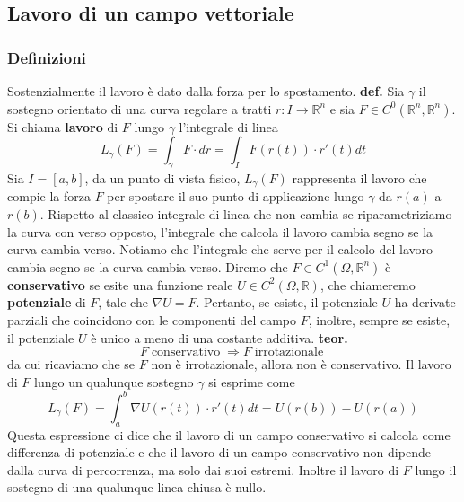 \subsection{Lavoro di un campo vettoriale}
\subsubsection{Definizioni}
Sostenzialmente il lavoro è dato dalla forza per lo spostamento.\newline
\newline
\textbf{def.} Sia $\gamma$ il sostegno orientato di una curva regolare a tratti $r: I \rightarrow \mathbb{R}^n$ e sia $F \in C ^0(\mathbb{R}^n, \mathbb{R}^n)$. Si chiama \textbf{lavoro} di $F$ lungo $\gamma$ l'integrale di linea
\[
    L_\gamma (F) = \int_{\gamma} F \cdot dr = \int_{I} F(r(t))\cdot r'(t) dt
\]
Sia $I = [a,b]$, da un punto di vista fisico, $L_\gamma(F)$ rappresenta il lavoro che compie la forza $F$ per spostare il suo punto di applicazione lungo $\gamma$ da $r(a)$ a $r(b)$.\newline
Rispetto al classico integrale di linea che non cambia se riparametriziamo la curva con verso opposto, l'integrale che calcola il lavoro cambia segno se la curva cambia verso.\newline
\newline
Notiamo che l'integrale che serve per il calcolo del lavoro cambia segno se la curva cambia verso.
\newline
\newline
Diremo che $F \in C^1(\Omega, \mathbb{R}^n)$ è \textbf{conservativo} se esite una funzione reale $U \in C^2(\Omega, \mathbb{R})$, che chiameremo \textbf{potenziale} di $F$, tale che $\nabla U = F$.\newline
\newline
Pertanto, se esiste, il potenziale $U$ ha derivate parziali che coincidono con le componenti del campo $F$, inoltre, sempre se esiste, il potenziale $U$ è unico a meno di una costante additiva.\newline
\newline
\textbf{teor.} 
\[
    F \; \text{conservativo}\; \Longrightarrow F \; \text{irrotazionale}\;
\]
da cui ricaviamo che se $F$ non è irrotazionale, allora non è conservativo.\newline
\newline
Il lavoro di $F$ lungo un qualunque sostegno $\gamma$ si esprime come
\[
    L_\gamma(F) = \int_{a}^{b}\nabla U(r(t)) \cdot r'(t) dt = U(r(b)) - U(r(a))
\]
Questa espressione ci dice che il lavoro di un campo conservativo si calcola come differenza di potenziale e che il lavoro di un campo conservativo non dipende dalla curva di percorrenza, ma solo dai suoi estremi. Inoltre il lavoro di $F$ lungo il sostegno di una qualunque linea chiusa è nullo.\newline
